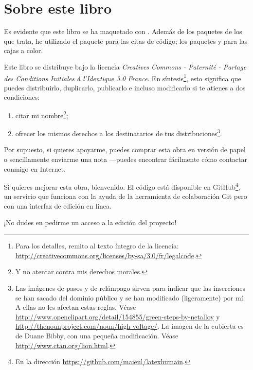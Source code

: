 

\section*{Sobre este libro}\thispagestyle{plain}


Es evidente que este libro se ha maquetado con \XeLaTeX. Además de los paquetes de los que trata, he utilizado el paquete  para las citas de código; los paquetes  y  para las cajas a color.

Este libro se distribuye bajo la licencia \emph{Creatives Commons - Paternité - Partage des Conditions Initiales à l'Identique 3.0 France}. En síntesis\footnote{Para los detalles, remito al texto íntegro de la licencia: \url{http://creativecommons.org/licenses/by-sa/3.0/fr/legalcode}.}, esto significa que puedes distribuirlo, duplicarlo, publicarlo e incluso modificarlo si te atienes a dos condiciones:
\begin{enumerate}
\item citar mi nombre\footnote{Y no atentar contra mis derechos morales.};
\item ofrecer los mismos derechos a los destinatarios de tus distribuciones\footnote{Las imágenes de pasos y de relámpago sirven para indicar que las inserciones se han sacado del dominio público y se han modificado (ligeramente) por mí. A ellas no les afectan estas reglas. Véase \url{http://www.openclipart.org/detail/154855/green-steps-by-netalloy} y \url{http://thenounproject.com/noun/high-voltage/}. La imagen de la cubierta es de  Duane  Bibby, con una pequeña modificación. Véase \url{http://www.ctan.org/lion.html}.}.
\end{enumerate}

Por supuesto, si quieres apoyarme, puedes comprar esta obra en versión de papel o sencillamente enviarme una nota ---puedes encontrar fácilmente cómo contactar conmigo en Internet.

Si quieres mejorar esta obra, bienvenido. El código está disponible en GitHub\footnote{En la dirección \url{https://github.com/maieul/latexhumain}.}, un servicio que funciona con la ayuda de la herramienta de colaboración Git pero con una interfaz de edición en línea.

¡No dudes en pedirme un acceso a la edición del proyecto!
